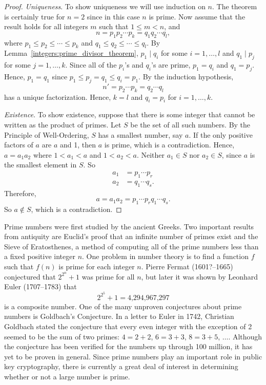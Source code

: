 \begin{proof}
{\em Uniqueness}.
To show uniqueness we will use induction on $n$. The theorem is certainly true for $n = 2$ since in this case $n$ is prime.  Now assume that the result holds for all integers $m$ such that $1 \leq m < n$, and 
\[
n = p_1 p_2 \cdots p_k = q_1 q_2 \cdots q_l,
\]
where $p_1 \leq p_2 \leq \cdots \leq p_k$ and $q_1 \leq q_2 \leq \cdots \leq q_l$. By Lemma~\ref{integers:prime_divisor_theorem}, $p_1  \mid  q_i$ for some $i = 1, \ldots, l$ and $q_1  \mid  p_j$ for some $j = 1, \ldots, k$.  Since all of the $p_i$'s and $q_i$'s are prime, $p_1 = q_i$ and  $q_1 = p_j$. Hence, $p_1 = q_1$ since $p_1 \leq p_j = q_1 \leq q_i = p_1$.  By the induction hypothesis, 
\[
n' = p_2 \cdots p_k = q_2 \cdots q_l
\]
has a unique factorization.  Hence, $k=l$ and $q_i = p_i$ for $i = 1, \ldots, k$. 

{\em Existence}.
To show existence, suppose that there is some integer that cannot be written as the product of primes.  Let $S$ be the set of all such numbers.  By the Principle of Well-Ordering, $S$ has a smallest number, say $a$.  If the only positive factors of $a$ are $a$ and 1, then $a$ is prime, which is a contradiction.  Hence, $a = a_1 a_2$ where $1 < a_1 < a$ and $1 < a_2 < a$.  Neither $a_1\in S$ nor $a_2 \in S$, since $a$ is the smallest element in $S$.  So 
\begin{align*}
a_1 & = p_1 \cdots p_r \\
a_2 & = q_1 \cdots q_s.
\end{align*}
Therefore,
\[
a = a_1 a_2 = p_1 \cdots p_r q_1 \cdots q_s.
\]
So $a \notin S$, which is a contradiction.
\end{proof}
 
\histhead

\noindent
\parbox{\textwidth}
{\small \histf
Prime numbers were first studied by the ancient Greeks.  Two important results from antiquity are Euclid's proof that an infinite number of primes exist and the Sieve of Eratosthenes, a method of computing all of the prime numbers less than a fixed positive integer $n$.  One problem in number theory is to find a function $f$ such that $f(n)$ is prime for each integer $n$. Pierre Fermat (1601?--1665) conjectured that $2^{2^n} + 1$ was prime for all $n$, but later it was shown by Leonhard Euler (1707--1783) that 
\[
2^{2^5} + 1 = \text{4,294,967,297}
\]
is a composite number. One of the many unproven conjectures about prime numbers is Goldbach's Conjecture.  In a letter to Euler in 1742, Christian Goldbach stated the conjecture that every even integer with the exception of 2 seemed to be the sum of two primes:  $4 = 2 + 2$, $6 = 3 + 3$, $8 =3 + 5$, $\ldots$.  Although the conjecture has been verified for the numbers up through 100 million, it has yet to be proven in general.  Since prime numbers play an important role in public key cryptography, there is currently a great deal of interest in determining whether or not a large number is prime.
\histbox
}


